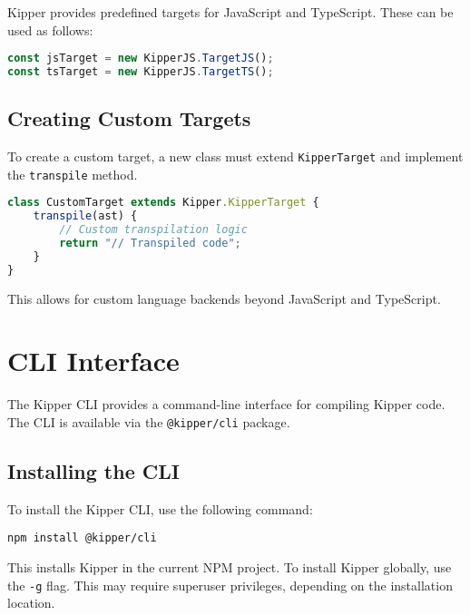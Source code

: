 Kipper provides predefined targets for JavaScript and TypeScript. These can be used as follows:

\begin{lstlisting}[language=Typescript, caption=Using Compilation Targets, label=lst:using_targets]
const jsTarget = new KipperJS.TargetJS();
const tsTarget = new KipperJS.TargetTS();
\end{lstlisting}

\subsection{Creating Custom Targets}
\label{subsec:custom_targets}

To create a custom target, a new class must extend \lstinline|KipperTarget| and implement the \lstinline|transpile| method.

\begin{lstlisting}[language=Typescript, caption=Creating a Custom Compilation Target, label=lst:custom_target]
class CustomTarget extends Kipper.KipperTarget {
	transpile(ast) {
		// Custom transpilation logic
		return "// Transpiled code";
	}
}
\end{lstlisting}

This allows for custom language backends beyond JavaScript and TypeScript.

\section{CLI Interface}
\label{sec:cli_interface}

The Kipper CLI provides a command-line interface for compiling Kipper code. The CLI is available via the \lstinline|@kipper/cli| package.

\subsection{Installing the CLI}
\label{subsec:cli_installation}

To install the Kipper CLI, use the following command:

\begin{lstlisting}[caption=Installing Kipper CLI, label=lst:cli_install]
npm install @kipper/cli
\end{lstlisting}

This installs Kipper in the current NPM project. To install Kipper globally, use the \lstinline|-g| flag. This may require superuser privileges, depending on the installation location.

